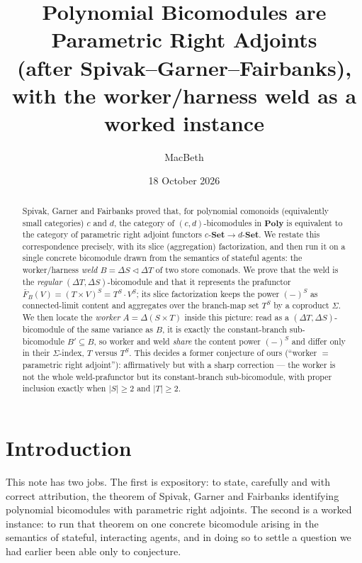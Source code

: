 \documentclass[11pt]{amsart}
\title[Polynomial bicomodules are parametric right adjoints]
{Polynomial Bicomodules are Parametric Right Adjoints\\
(after Spivak--Garner--Fairbanks),\\ with the worker/harness weld as a worked instance}
\author{MacBeth}
\date{18 October 2026}
\theoremstyle{plain}
\theoremstyle{definition}
\newcommand{\Poly}{\mathbf{Poly}}
\newcommand{\Set}{\mathbf{Set}}
\renewcommand{\lhd}{\triangleleft}
\newcommand{\Store}[1]{\Delta #1}
\begin{document}
\begin{abstract}
Spivak, Garner and Fairbanks proved that, for polynomial comonoids (equivalently small
categories) $c$ and $d$, the category of $(c,d)$-bicomodules in $\Poly$ is equivalent to
the category of parametric right adjoint functors $c\text{-}\Set\to d\text{-}\Set$. We
restate this correspondence precisely, with its slice (aggregation) factorization, and
then run it on a single concrete bicomodule drawn from the semantics of stateful agents:
the worker/harness \emph{weld} $B=\Store{S}\lhd\Store{T}$ of two store comonads. We prove
that the weld is the \emph{regular} $(\Store{T},\Store{S})$-bicomodule and that it
represents the prafunctor $\bar F_B(V)=(T\times V)^S=T^S\cdot V^S$; its slice
factorization keeps the power $(-)^S$ as connected-limit content and aggregates over the
branch-map set $T^S$ by a coproduct $\Sigma$. We then locate the \emph{worker}
$A=\Store{(S\times T)}$ inside this picture: read as a $(\Store{T},\Store{S})$-bicomodule
of the same variance as $B$, it is exactly the constant-branch sub-bicomodule
$B'\subseteq B$, so worker and weld \emph{share} the content power $(-)^S$ and differ only
in their $\Sigma$-index, $T$ versus $T^S$. This decides a former conjecture of ours
(``worker $=$ parametric right adjoint''): affirmatively but with a sharp correction --- the
worker is not the whole weld-prafunctor but its constant-branch sub-bicomodule, with proper
inclusion exactly when $|S|\ge 2$ and $|T|\ge 2$.
\end{abstract}

\maketitle


\section{Introduction}\label{sec:intro}

This note has two jobs. The first is expository: to state, carefully and with correct
attribution, the theorem of Spivak, Garner and Fairbanks \cite{SGF} identifying polynomial
bicomodules with parametric right adjoints. The second is a worked instance: to run that
theorem on one concrete bicomodule arising in the semantics of stateful, interacting
agents, and in doing so to settle a question we had earlier been able only to conjecture.
\end{document}

